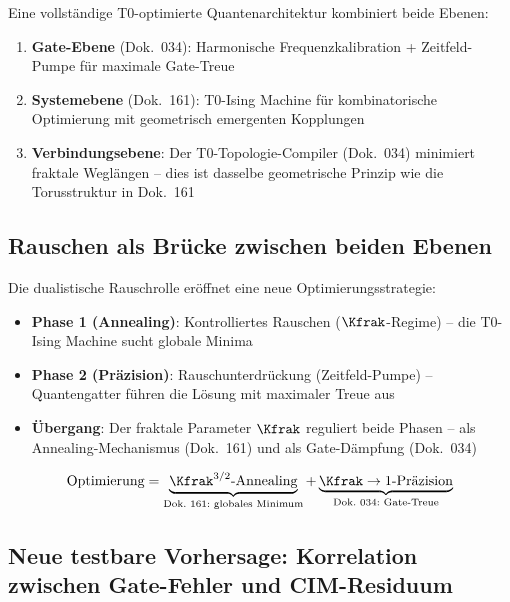 \begin{keyresult}
    Eine vollständige T0-optimierte Quantenarchitektur kombiniert beide Ebenen:
    \begin{enumerate}
        \item \textbf{Gate-Ebene} (Dok.\ 034): Harmonische Frequenzkalibration +
        Zeitfeld-Pumpe für maximale Gate-Treue
        \item \textbf{Systemebene} (Dok.\ 161): T0-Ising Machine für kombinatorische
        Optimierung mit geometrisch emergenten Kopplungen
        \item \textbf{Verbindungsebene}: Der T0-Topologie-Compiler (Dok.\ 034) minimiert
        fraktale Weglängen -- dies ist dasselbe geometrische Prinzip wie die
        Torusstruktur in Dok.\ 161
    \end{enumerate}
\end{keyresult}

\subsection{Rauschen als Brücke zwischen beiden Ebenen}

Die dualistische Rauschrolle eröffnet eine neue Optimierungsstrategie:

\begin{itemize}
    \item \textbf{Phase 1 (Annealing)}: Kontrolliertes Rauschen ($\Kfrak$-Regime)
    -- die T0-Ising Machine sucht globale Minima
    \item \textbf{Phase 2 (Präzision)}: Rauschunterdrückung (Zeitfeld-Pumpe)
    -- Quantengatter führen die Lösung mit maximaler Treue aus
    \item \textbf{Übergang}: Der fraktale Parameter $\Kfrak$ reguliert beide Phasen --
    als Annealing-Mechanismus (Dok.\ 161) und als Gate-Dämpfung (Dok.\ 034)
\end{itemize}

\begin{equation}
    \text{Optimierung} = \underbrace{\Kfrak^{3/2}\text{-Annealing}}_{\text{Dok.\ 161:\ globales Minimum}}
    + \underbrace{\Kfrak \rightarrow 1\text{-Präzision}}_{\text{Dok.\ 034:\ Gate-Treue}}
    \label{eq:hybrid_optimization}
\end{equation}

\subsection{Neue testbare Vorhersage: Korrelation zwischen Gate-Fehler und CIM-Residuum}

